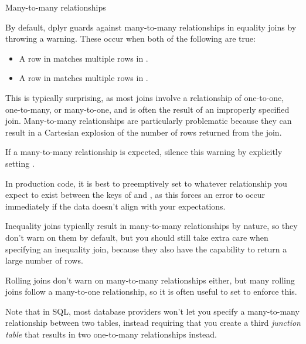 \documentclass[a4paper]{book}
\begin{document}
\begin{Section}{Many-to-many relationships}


By default, dplyr guards against many-to-many relationships in equality joins
by throwing a warning. These occur when both of the following are true:
\begin{itemize}

\item{} A row in  matches multiple rows in .
\item{} A row in  matches multiple rows in .

\end{itemize}


This is typically surprising, as most joins involve a relationship of
one-to-one, one-to-many, or many-to-one, and is often the result of an
improperly specified join. Many-to-many relationships are particularly
problematic because they can result in a Cartesian explosion of the number of
rows returned from the join.

If a many-to-many relationship is expected, silence this warning by
explicitly setting .

In production code, it is best to preemptively set  to whatever
relationship you expect to exist between the keys of  and , as this
forces an error to occur immediately if the data doesn't align with your
expectations.

Inequality joins typically result in many-to-many relationships by nature, so
they don't warn on them by default, but you should still take extra care when
specifying an inequality join, because they also have the capability to
return a large number of rows.

Rolling joins don't warn on many-to-many relationships either, but many
rolling joins follow a many-to-one relationship, so it is often useful to
set  to enforce this.

Note that in SQL, most database providers won't let you specify a
many-to-many relationship between two tables, instead requiring that you
create a third \emph{junction table} that results in two one-to-many relationships
instead.
\end{Section}
%
\end{document}
